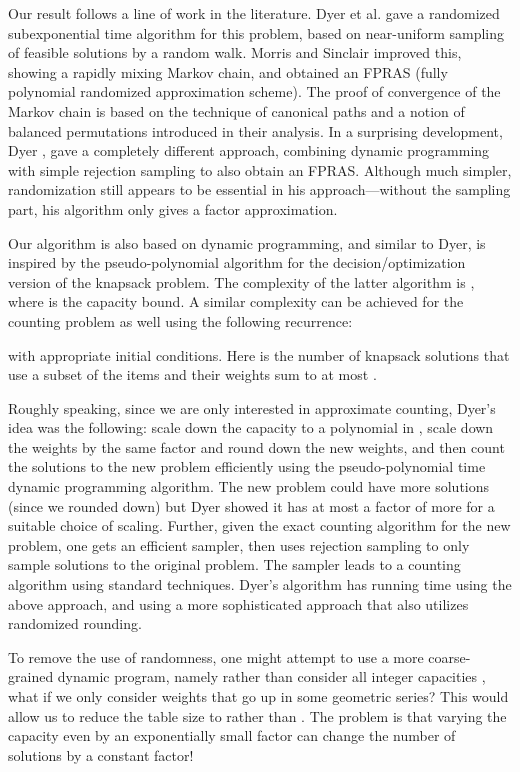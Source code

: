 \documentclass[11pt]{article}
\begin{document}
Our result follows a line of work in the literature. Dyer et al.
\cite{DFKKPV} gave a randomized subexponential time algorithm for
this problem, based on near-uniform sampling of feasible solutions
by a random walk. Morris and Sinclair \cite{MorrisSinclair}
improved this, showing a rapidly mixing Markov chain, and obtained
an FPRAS (fully polynomial randomized approximation scheme). The
proof of convergence of the Markov chain is based on the technique
of canonical paths and a notion of balanced permutations
introduced in their analysis. In a surprising development, Dyer
\cite{Dyer}, gave a completely different approach, combining
dynamic programming with simple rejection sampling to also obtain
an FPRAS. Although much simpler, randomization still appears to be
essential in his approach---without the sampling part, his
algorithm only gives a factor  approximation.

Our algorithm is also based on dynamic programming, and similar to
Dyer, is inspired by the pseudo-polynomial algorithm for the
decision/optimization version of the knapsack problem. The
complexity of the latter algorithm is , where  is the
capacity bound. A similar complexity can be achieved for the
counting problem as well using the following recurrence:

with appropriate initial conditions. Here  is the number
of knapsack solutions that use a subset of the items  and their weights sum to at most .

Roughly speaking, since we are only interested in approximate
counting, Dyer's idea was the following: scale down the capacity
to a polynomial in , scale down the weights by the same factor
and round down the new weights, and then
count the solutions to the new problem efficiently using the
pseudo-polynomial time dynamic programming algorithm. The
new problem could have more solutions (since we rounded down)
but Dyer showed it has at
most a factor of  more for a suitable choice of scaling.
Further, given the exact counting algorithm for the new problem,
one gets an efficient sampler, then uses rejection sampling to
only sample solutions to the original problem. The sampler leads
to a counting algorithm using standard techniques.
Dyer's algorithm has running time  using
the above approach, and 
using a more
sophisticated approach that also utilizes randomized rounding.

To remove the use of randomness, one might attempt to use a more
coarse-grained dynamic program, namely rather than consider all
integer capacities , what if we only consider
weights that go up in some geometric series? This would allow us
to reduce the table size to  rather than . The
problem is that varying the capacity even by an exponentially
small factor  can change the number of solutions by a
constant factor!
\end{document}
